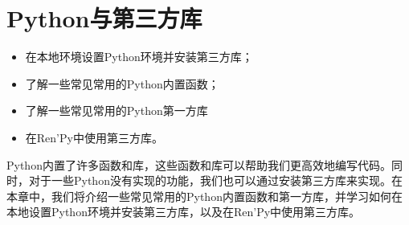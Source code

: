 \documentclass[../../Main.tex]{subfiles}
\begin{document}
\chapter{Python与第三方库}
\begin{ChapterGoals}
    \begin{itemize}
        \item 在本地环境设置Python环境并安装第三方库；
        \item 了解一些常见常用的Python内置函数；
        \item 了解一些常见常用的Python第一方库
        \item 在Ren'Py中使用第三方库。
    \end{itemize}
\end{ChapterGoals}

Python内置了许多函数和库，这些函数和库可以帮助我们更高效地编写代码。同时，对于一些Python没有实现的功能，我们也可以通过安装第三方库来实现。在本章中，我们将介绍一些常见常用的Python内置函数和第一方库，并学习如何在本地设置Python环境并安装第三方库，以及在Ren'Py中使用第三方库。




\end{document}
